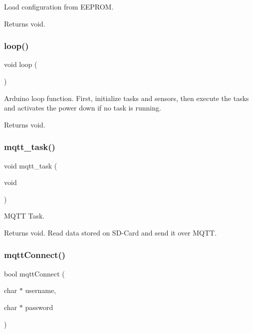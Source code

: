 Load configuration from E\+E\+P\+R\+OM. 

\begin{DoxyReturn}{Returns}
void. 
\end{DoxyReturn}
\mbox{\label{rmap_8ino_afe461d27b9c48d5921c00d521181f12f}} 
\subsubsection{\texorpdfstring{loop()}{loop()}}
{\footnotesize\ttfamily void loop (\begin{DoxyParamCaption}{ }\end{DoxyParamCaption})}



Arduino loop function. First, initialize tasks and sensors, then execute the tasks and activates the power down if no task is running. 

\begin{DoxyReturn}{Returns}
void. 
\end{DoxyReturn}
\mbox{\label{rmap_8ino_a161bca6629368a46242fec07a965966a}} 
\subsubsection{\texorpdfstring{mqtt\+\_\+task()}{mqtt\_task()}}
{\footnotesize\ttfamily void mqtt\+\_\+task (\begin{DoxyParamCaption}\item[{void}]{ }\end{DoxyParamCaption})}



M\+Q\+TT Task. 

\begin{DoxyReturn}{Returns}
void. Read data stored on S\+D-\/\+Card and send it over M\+Q\+TT. 
\end{DoxyReturn}
\mbox{\label{rmap_8ino_a9f5e5ca8c47d4536dd1805e89fbb7db2}} 
\subsubsection{\texorpdfstring{mqtt\+Connect()}{mqttConnect()}}
{\footnotesize\ttfamily bool mqtt\+Connect (\begin{DoxyParamCaption}\item[{char $\ast$}]{username,  }\item[{char $\ast$}]{password }\end{DoxyParamCaption})}



